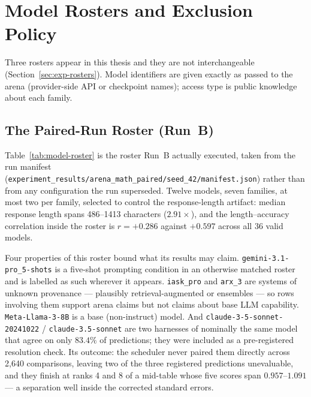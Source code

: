 \chapter{Model Rosters and Exclusion Policy}\label{app:models}

Three rosters appear in this thesis and they are not interchangeable
(Section~\ref{sec:exp-rosters}). Model identifiers are given exactly as
passed to the arena (provider-side API or checkpoint names); access
type is public knowledge about each family.

\section{The Paired-Run Roster (Run~B)}

Table~\ref{tab:model-roster} is the roster Run~B actually executed,
taken from the run manifest
(\texttt{experiment\_results/arena\_math\_paired/seed\_42/manifest.json})
rather than from any configuration the run superseded. Twelve models,
seven families, at most two per family, selected to control the
response-length artifact: median response length spans 486--1413
characters ($2.91\times$), and the length--accuracy correlation inside
the roster is $r = +0.286$ against $+0.597$ across all 36 valid models.

Four properties of this roster bound what its results may claim.
\texttt{gemini-3.1-pro\_5-shots} is a five-shot prompting condition in
an otherwise matched roster and is labelled as such wherever it
appears. \texttt{iask\_pro} and \texttt{arx\_3} are systems of
unknown provenance --- plausibly retrieval-augmented or ensembles ---
so rows involving them support arena claims but not claims about base
LLM capability. \texttt{Meta-Llama-3-8B} is a base (non-instruct)
model. And \texttt{claude-3-5-sonnet-20241022} /
\texttt{claude-3.5-sonnet} are two harnesses of nominally the same
model that agree on only $83.4\%$ of predictions; they were included
as a pre-registered resolution check. Its outcome: the scheduler never
paired them directly across 2{,}640 comparisons, leaving two of the
three registered predictions unevaluable, and they finish at ranks 4
and 8 of a mid-table whose five scores span $0.957$--$1.091$ --- a
separation well inside the corrected standard errors.

